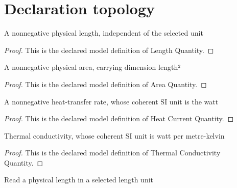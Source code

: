 \section{Declaration topology}
\begin{definition}
  \label{def:physics:phyx-mini-0468:phyxminiproblems-problemphyxmini0468-lengthquantity}
  A nonnegative physical length, independent of the selected unit
\end{definition}
\begin{proof}
  This is the declared model definition of Length Quantity.
\end{proof}
\begin{definition}
  \label{def:physics:phyx-mini-0468:phyxminiproblems-problemphyxmini0468-areaquantity}
  A nonnegative physical area, carrying dimension length²
\end{definition}
\begin{proof}
  This is the declared model definition of Area Quantity.
\end{proof}
\begin{definition}
  \label{def:physics:phyx-mini-0468:phyxminiproblems-problemphyxmini0468-heatcurrentquantity}
  A nonnegative heat-transfer rate, whose coherent SI unit is the watt
\end{definition}
\begin{proof}
  This is the declared model definition of Heat Current Quantity.
\end{proof}
\begin{definition}
  \label{def:physics:phyx-mini-0468:phyxminiproblems-problemphyxmini0468-thermalconductivityquantity}
  Thermal conductivity, whose coherent SI unit is watt per metre-kelvin
\end{definition}
\begin{proof}
  This is the declared model definition of Thermal Conductivity Quantity.
\end{proof}
\begin{definition}
  \label{def:physics:phyx-mini-0468:phyxminiproblems-problemphyxmini0468-lengthreadout}
  Read a physical length in a selected length unit
\end{definition}

